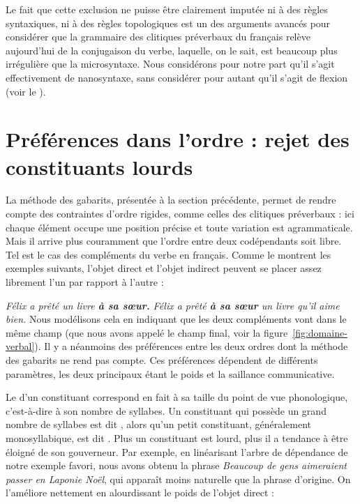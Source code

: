 {    Le fait que cette exclusion ne puisse être clairement imputée ni à des règles syntaxiques, ni à des règles topologiques est un des arguments avancés pour considérer que la grammaire des clitiques préverbaux du français relève aujourd’hui de la conjugaison du verbe, laquelle, on le sait, est beaucoup plus irrégulière que la microsyntaxe. Nous considérons pour notre part qu’il s’agit effectivement de nanosyntaxe, sans considérer pour autant qu’il s’agit de flexion (voir le ).
}
\section{Préférences dans l’ordre : rejet des constituants lourds}\label{sec:3.5.21}

La méthode des gabarits, présentée à la section précédente,  permet de rendre compte des contraintes d’ordre rigides, comme celles des clitiques préverbaux : ici chaque élément occupe une position précise et toute variation est agrammaticale. Mais il arrive plus couramment que l’ordre entre deux codépendants soit libre. Tel est le cas des compléments du verbe en français. Comme le montrent les exemples suivants, l’objet direct et l’objet indirect peuvent se placer assez librement l’un par rapport à l’autre :

\ea \ea \textit{{Félix a prêté} un livre \textbf{{à sa sœur.}}}
    \ex \textit{{Félix a prêté} \textbf{{à sa sœur}} un livre qu’il aime bien.}
    \z
\z
Nous modélisons cela en indiquant que les deux compléments vont dans le même champ (que nous avons appelé le champ final, voir la figure~\ref{fig:domaine-verbal}). Il y a néanmoins des préférences entre les deux ordres dont la méthode des gabarits ne rend pas compte. Ces préférences dépendent de différents paramètres, les deux principaux étant le poids et la saillance communicative.

Le  d’un constituant correspond en fait à sa taille du point de vue phonologique, c’est-à-dire à son nombre de syllabes. Un constituant qui possède un grand nombre de syllabes est dit , alors qu’un petit constituant, généralement monosyllabique, est dit . Plus un constituant est lourd, plus il a tendance à être éloigné de son gouverneur. Par exemple, en linéarisant l’arbre de dépendance de notre exemple favori, nous avons obtenu la phrase \textit{Beaucoup de gens aimeraient passer en Laponie Noël}, qui apparaît moins naturelle que la phrase d’origine. On l’améliore nettement en alourdissant le poids de l’objet direct :

